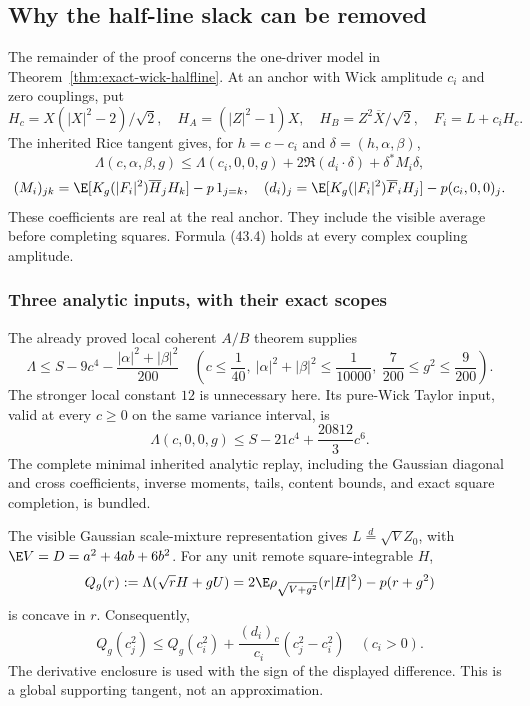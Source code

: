 \subsection{Why the half-line slack can be removed}
The remainder of the proof concerns the one-driver model in
Theorem~\ref{thm:exact-wick-halfline}.
At an anchor with Wick amplitude $c_i$ and zero couplings, put
\[
 H_c=X(|X|^2-2)/\sqrt2,\quad H_A=(|Z|^2-1)X,\quad
 H_B=Z^2\overline X/\sqrt2,\quad F_i=L+c_iH_c.
\]
The inherited Rice tangent gives, for $h=c-c_i$ and
$\delta=(h,\alpha,\beta)$,
\[
 \Lambda(c,\alpha,\beta,g)\le
 \Lambda(c_i,0,0,g)+2\Re(d_i\cdot\delta)+\delta^*M_i\delta,
 \tag{43.4}
\]
\[
 (M_i)_{jk}=\E[K_g(|F_i|^2)\overline H_jH_k]-p\,1_{j=k},
 \quad
 (d_i)_j=\E[K_g(|F_i|^2)\overline F_iH_j]-p(c_i,0,0)_j.
\]
These coefficients are real at the real anchor. They include the visible
average before completing squares. Formula (43.4) holds at every
complex coupling amplitude.

\subsubsection{Three analytic inputs, with their exact scopes}
The already proved local coherent $A/B$ theorem supplies
\[
 \Lambda\le S-9c^4-\frac{|\alpha|^2+|\beta|^2}{200}
 \quad
 \left(c\le\frac1{40},\
 |\alpha|^2+|\beta|^2\le\frac1{10000},\
 \frac7{200}\le g^2\le\frac9{200}\right).
 \tag{43.5}
\]
The stronger local constant $12$ is unnecessary here. Its pure-Wick
Taylor input, valid at every $c\ge0$ on the same variance interval, is
\[
 \Lambda(c,0,0,g)\le S-21c^4+\frac{20812}{3}c^6.       \tag{43.6}
\]
The complete minimal inherited analytic replay, including the
Gaussian diagonal and cross coefficients, inverse moments, tails,
content bounds, and exact square completion, is bundled.

The visible Gaussian scale-mixture representation gives
$L\overset d=\sqrt VZ_0$, with $\E V=D=a^2+4ab+6b^2$.
For any unit remote square-integrable $H$,
\[
 Q_g(r):=\Lambda(\sqrt rH+gU)
 =2\E\rho_{\sqrt{V+g^2}}(r|H|^2)-p(r+g^2)
\]
is concave in $r$. Consequently,
\[
 Q_g(c_j^2)\le Q_g(c_i^2)
        +\frac{(d_i)_c}{c_i}(c_j^2-c_i^2)
          \quad(c_i>0).                              \tag{43.7}
\]
The derivative enclosure is used with the sign of the displayed
difference. This is a global supporting tangent, not an approximation.

